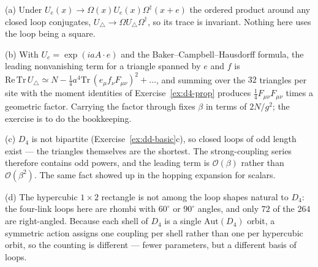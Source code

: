 {(a) Under $U_e(x)\to\Omega(x)U_e(x)\Omega^\dagger(x+e)$ the ordered product
around any closed loop conjugates, $U_\triangle\to\Omega U_\triangle
\Omega^\dagger$, so its trace is invariant. Nothing here uses the loop being a
square.

(b) With $U_e=\exp(iaA\!\cdot\!e)$ and the Baker--Campbell--Hausdorff formula,
the leading nonvanishing term for a triangle spanned by $e$ and $f$ is
$\mathrm{Re}\,\mathrm{Tr}\,U_\triangle \simeq N-\tfrac14 a^4
\mathrm{Tr}\,(e_\mu f_\nu F_{\mu\nu})^2 + \dots$, and summing over the $32$
triangles per site with the moment identities of
Exercise~\ref{ex:d4-prop} produces $\tfrac14F_{\mu\nu}F_{\mu\nu}$ times a
geometric factor. Carrying the factor through fixes $\beta$ in terms of
$2N/g^2$; the exercise is to do the bookkeeping.

(c) $D_4$ is not bipartite (Exercise~\ref{ex:dd-basic}c), so closed loops of odd
length exist --- the triangles themselves are the shortest. The
strong-coupling series therefore contains odd powers, and the leading term is
$\mathcal{O}(\beta)$ rather than $\mathcal{O}(\beta^2)$. The same fact showed up
in the hopping expansion for scalars.

(d) The hypercubic $1\times2$ rectangle is not among the loop shapes natural to
$D_4$: the four-link loops here are rhombi with $60^\circ$ or $90^\circ$
angles, and only $72$ of the $264$ are right-angled. Because each shell of
$D_4$ is a single $\mathrm{Aut}(D_4)$ orbit, a symmetric action assigns one
coupling per shell rather than one per hypercubic orbit, so the counting is
different --- fewer parameters, but a different basis of loops.}

